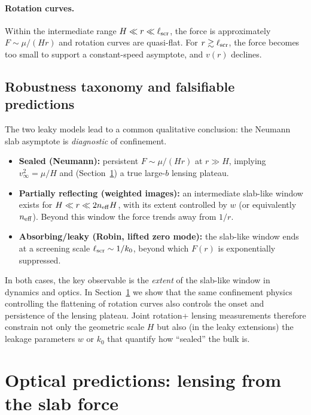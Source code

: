 \documentclass[11pt]{article}
\begin{document}
\paragraph{Rotation curves.}
Within the intermediate range $H\ll r\ll \ell_{\rm scr}$, the force is approximately $F\sim \mu/(Hr)$
and rotation curves are quasi-flat.  For $r\gtrsim \ell_{\rm scr}$, the force becomes too small to
support a constant-speed asymptote, and $v(r)$ declines.

\subsection{Robustness taxonomy and falsifiable predictions}
\label{sec:leaky_taxonomy}

The two leaky models lead to a common qualitative conclusion: the Neumann slab asymptote is
\emph{diagnostic} of confinement.

\begin{itemize}
\item \textbf{Sealed (Neumann):} persistent $F\sim \mu/(Hr)$ at $r\gg H$, implying
      $v_\infty^2=\mu/H$ and (Section~\ref{sec:lensing}) a true large-$b$ lensing plateau.

\item \textbf{Partially reflecting (weighted images):} an intermediate slab-like window exists for
      $H\ll r\ll 2n_{\rm eff}H$, with its extent controlled by $w$ (or equivalently $n_{\rm eff}$).
      Beyond this window the force trends away from $1/r$.

\item \textbf{Absorbing/leaky (Robin, lifted zero mode):} the slab-like window ends at a screening
      scale $\ell_{\rm scr}\sim 1/k_0$, beyond which $F(r)$ is exponentially suppressed.
\end{itemize}

In both cases, the key observable is the \emph{extent} of the slab-like window in dynamics and optics.
In Section~\ref{sec:lensing} we show that the same confinement physics controlling the flattening of
rotation curves also controls the onset and persistence of the lensing plateau.  Joint rotation+%
lensing measurements therefore constrain not only the geometric scale $H$ but also (in the leaky
extensions) the leakage parameters $w$ or $k_0$ that quantify how ``sealed'' the bulk is.

\section{Optical predictions: lensing from the slab force}
\label{sec:lensing}
\end{document}
